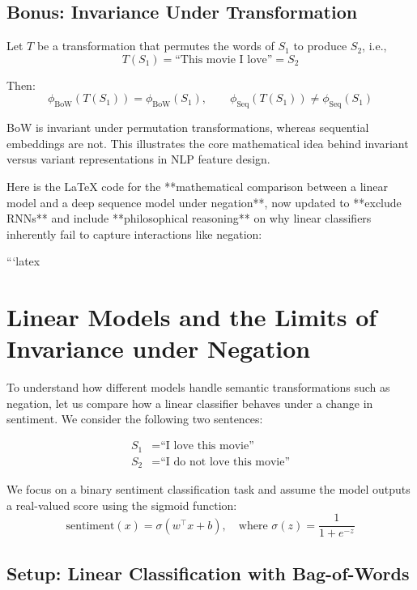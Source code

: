 \subsection*{Bonus: Invariance Under Transformation}

Let $T$ be a transformation that permutes the words of $S_1$ to produce $S_2$, i.e.,
\[
T(S_1) = \text{``This movie I love''} = S_2
\]

Then:
\[
\phi_{\text{BoW}}(T(S_1)) = \phi_{\text{BoW}}(S_1), \qquad
\phi_{\text{Seq}}(T(S_1)) \ne \phi_{\text{Seq}}(S_1)
\]

\begin{tcolorbox}[colback=gray!10, colframe=black, title=Key Insight]
	BoW is invariant under permutation transformations, whereas sequential embeddings are not. This illustrates the core mathematical idea behind invariant versus variant representations in NLP feature design.
\end{tcolorbox}
Here is the LaTeX code for the **mathematical comparison between a linear model and a deep sequence model under negation**, now updated to **exclude RNNs** and include **philosophical reasoning** on why linear classifiers inherently fail to capture interactions like negation:

```latex
\section*{Linear Models and the Limits of Invariance under Negation}

To understand how different models handle semantic transformations such as negation, let us compare how a linear classifier behaves under a change in sentiment. We consider the following two sentences:

\begin{align*}
	S_1 &= \text{``I love this movie''} \\
	S_2 &= \text{``I do not love this movie''}
\end{align*}

We focus on a binary sentiment classification task and assume the model outputs a real-valued score using the sigmoid function:
\[
\text{sentiment}(x) = \sigma(w^\top x + b), \quad \text{where } \sigma(z) = \frac{1}{1 + e^{-z}}
\]

\subsection*{Setup: Linear Classification with Bag-of-Words}


